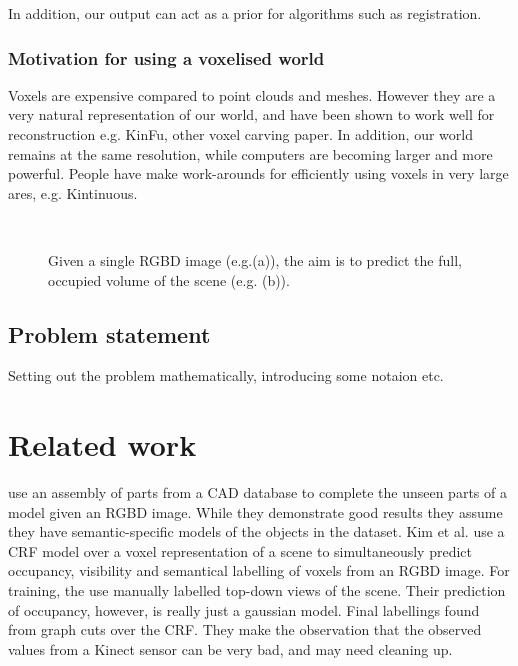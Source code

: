 \documentclass[10pt,a4paper]{article}
\makeatletter
\newcommand*{\eg}{e.g.\@\xspace}
\newcommand*{\ea}{et al.\@\xspace}
\makeatother
\begin{document}
In addition, our output can act as a prior for algorithms such as registration.

\subsubsection{Motivation for using a voxelised world}

Voxels are expensive compared to point clouds and meshes. 
However they are a very natural representation of our world, and have been shown to work well for reconstruction \eg KinFu, other voxel carving paper. 
In addition, our world remains at the same resolution, while computers are becoming larger and more powerful. 
People have make work-arounds for efficiently using voxels in very large ares, \eg Kintinuous.

\begin{figure}
	\centering 
		\hfill
	 \\
	\caption{Given a single RGBD image (\eg (a)), the aim is to predict the full, occupied volume of the scene (e.g. (b)).}
\end{figure}

\subsection{Problem statement}

Setting out the problem mathematically, introducing some notaion etc.


\section{Related work}

\cite{shen-tog-2012} use an assembly of parts from a CAD database to complete the unseen parts of a model given an RGBD image. While they demonstrate good results they assume they have semantic-specific models of the objects in the dataset.
Kim \ea \cite{kim-iccv-2013} use a CRF model over a voxel representation of a scene to simultaneously predict occupancy, visibility and semantical labelling of voxels from an RGBD image. For training, the use manually labelled top-down views of the scene. Their prediction of occupancy, however, is really just a gaussian model. Final labellings found from graph cuts over the CRF. They make the observation that the observed values from a Kinect sensor can be very bad, and may need cleaning up.
\end{document}
